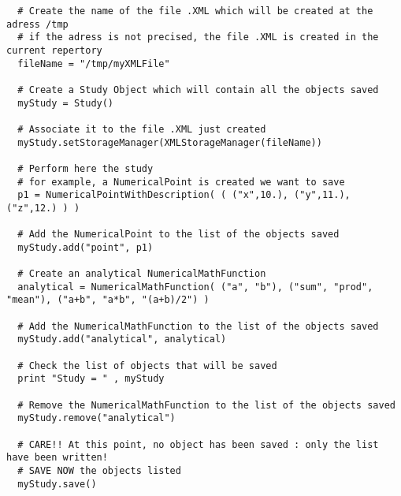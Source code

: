 \begin{lstlisting}
  # Create the name of the file .XML which will be created at the adress /tmp
  # if the adress is not precised, the file .XML is created in the current repertory
  fileName = "/tmp/myXMLFile"

  # Create a Study Object which will contain all the objects saved
  myStudy = Study()

  # Associate it to the file .XML just created
  myStudy.setStorageManager(XMLStorageManager(fileName))

  # Perform here the study
  # for example, a NumericalPoint is created we want to save
  p1 = NumericalPointWithDescription( ( ("x",10.), ("y",11.), ("z",12.) ) )

  # Add the NumericalPoint to the list of the objects saved
  myStudy.add("point", p1)

  # Create an analytical NumericalMathFunction
  analytical = NumericalMathFunction( ("a", "b"), ("sum", "prod", "mean"), ("a+b", "a*b", "(a+b)/2") )

  # Add the NumericalMathFunction to the list of the objects saved
  myStudy.add("analytical", analytical)

  # Check the list of objects that will be saved
  print "Study = " , myStudy

  # Remove the NumericalMathFunction to the list of the objects saved
  myStudy.remove("analytical")

  # CARE!! At this point, no object has been saved : only the list have been written!
  # SAVE NOW the objects listed
  myStudy.save()
\end{lstlisting}
